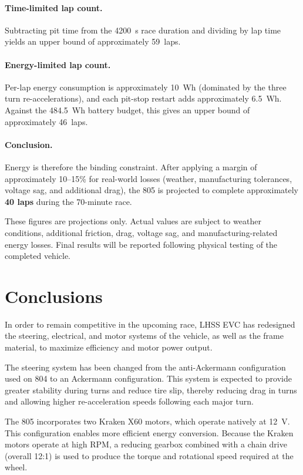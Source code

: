 \documentclass[12pt]{article}
\begin{document}
\paragraph{Time-limited lap count.} Subtracting pit time from the 4200~s
race duration and dividing by lap time yields an upper bound of
approximately 59~laps.

\paragraph{Energy-limited lap count.} Per-lap energy consumption is
approximately 10~Wh (dominated by the three turn re-accelerations), and
each pit-stop restart adds approximately 6.5~Wh. Against the 484.5~Wh
battery budget, this gives an upper bound of approximately 46~laps.

\paragraph{Conclusion.} Energy is therefore the binding constraint. After
applying a margin of approximately 10--15\% for real-world losses
(weather, manufacturing tolerances, voltage sag, and additional drag), the
805 is projected to complete approximately \textbf{40 laps} during the
70-minute race.

These figures are projections only. Actual values are subject to weather
conditions, additional friction, drag, voltage sag, and
manufacturing-related energy losses. Final results will be reported
following physical testing of the completed vehicle.

\section{Conclusions}

In order to remain competitive in the upcoming race, LHSS EVC has
redesigned the steering, electrical, and motor systems of the vehicle, as
well as the frame material, to maximize efficiency and motor power output.

The steering system has been changed from the anti-Ackermann configuration
used on 804 to an Ackermann configuration. This system is expected to
provide greater stability during turns and reduce tire slip, thereby
reducing drag in turns and allowing higher re-acceleration speeds following
each major turn.

The 805 incorporates two Kraken X60 motors, which operate natively at 12~V.
This configuration enables more efficient energy conversion. Because the
Kraken motors operate at high RPM, a reducing gearbox combined with a chain
drive (overall 12:1) is used to produce the torque and rotational speed
required at the wheel.
\end{document}
